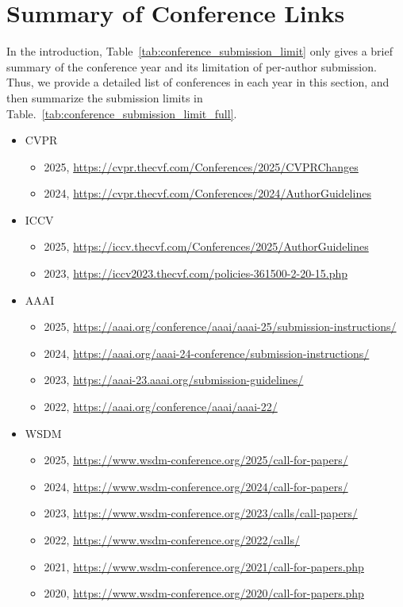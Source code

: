 \section{Summary of Conference Links} \label{app:sec:conference_links}

In the introduction, Table~\ref{tab:conference_submission_limit} only gives a brief summary of the conference year and its limitation of per-author submission. 
Thus, we provide a detailed list of conferences in each year in this section, and then summarize the submission limits in Table.~\ref{tab:conference_submission_limit_full}. 
\begin{itemize}
    \item CVPR 
    \begin{itemize}
        \item 2025, \url{https://cvpr.thecvf.com/Conferences/2025/CVPRChanges} 
        \item 2024, \url{https://cvpr.thecvf.com/Conferences/2024/AuthorGuidelines}
    \end{itemize}

    \item ICCV
    \begin{itemize}
        \item 2025, \url{https://iccv.thecvf.com/Conferences/2025/AuthorGuidelines}
        \item 2023, \url{https://iccv2023.thecvf.com/policies-361500-2-20-15.php}
    \end{itemize}
    
    \item AAAI
    \begin{itemize}
        \item 2025, \url{https://aaai.org/conference/aaai/aaai-25/submission-instructions/} 
        \item 2024, \url{https://aaai.org/aaai-24-conference/submission-instructions/} 
        \item 2023, \url{https://aaai-23.aaai.org/submission-guidelines/} 
        \item 2022, \url{https://aaai.org/conference/aaai/aaai-22/}
    \end{itemize}
    
    \item WSDM 
    \begin{itemize}
        \item 2025, \url{https://www.wsdm-conference.org/2025/call-for-papers/} 
        \item 2024, \url{https://www.wsdm-conference.org/2024/call-for-papers/} 
        \item 2023, \url{https://www.wsdm-conference.org/2023/calls/call-papers/} 
        \item 2022, \url{https://www.wsdm-conference.org/2022/calls/} 
        \item 2021, \url{https://www.wsdm-conference.org/2021/call-for-papers.php} 
        \item 2020, \url{https://www.wsdm-conference.org/2020/call-for-papers.php} 
    \end{itemize}
    

\end{itemize}
